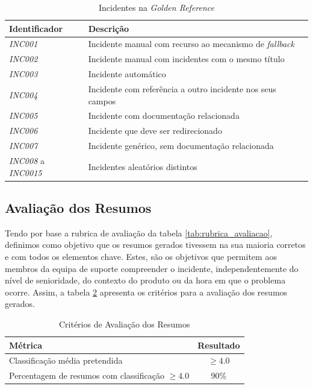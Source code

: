 	\begin{table}[H]
		\centering
		\begin{tabular}{|p{2.5cm}|p{10cm}|}
			\hline
			\textbf{Identificador} & \textbf{Descrição} \\
			\hline
			\textit{INC001} & Incidente manual com recurso ao mecanismo de \textit{fallback} \\
			\hline
			\textit{INC002} & Incidente manual com incidentes com o mesmo título\\
			\hline
			\textit{INC003} & Incidente automático \\
			\hline
			\textit{INC004} & Incidente com referência a outro incidente nos seus campos \\
			\hline
			\textit{INC005} & Incidente com documentação relacionada \\
			\hline
			\textit{INC006} & Incidente que deve ser redirecionado \\
			\hline
			\textit{INC007} & Incidente genérico, sem documentação relacionada \\
			\hline
			\textit{INC008} a \textit{INC0015} & Incidentes aleatórios distintos \\
			\hline
		\end{tabular}
		\caption[Incidentes na \textit{Golden Reference}]{Incidentes na \textit{Golden Reference}}
		\label{tab:Incidentes_golden}
	\end{table}

	\subsection{Avaliação dos Resumos}
		
		
		Tendo por base a rubrica de avaliação da tabela \ref{tab:rubrica_avaliacao}, definimos como objetivo que os resumos gerados tivessem na sua maioria corretos e com todos os elementos chave. Estes, são os objetivos que permitem aos membros da equipa de suporte compreender o incidente, independentemente do nível de senioridade, do contexto do produto ou da hora em que o problema ocorre. Assim, a tabela \ref{tab:classificacao-resumos} apresenta os critérios para a avaliação dos resumos gerados.
		
		\begin{table}[H]
			\centering
			\small
			\begin{tabular}{lc}
				\hline
				\textbf{Métrica} & \textbf{Resultado} \\
				\hline
				Classificação média pretendida &  $\geq4.0$ \\
				\hline
				Percentagem de resumos com classificação $\geq4.0$ & 90\% \\
				\hline
			\end{tabular}
			\caption[Critérios de Avaliação dos Resumos]{Critérios de Avaliação dos Resumos}
			\label{tab:classificacao-resumos}
		\end{table}
		
